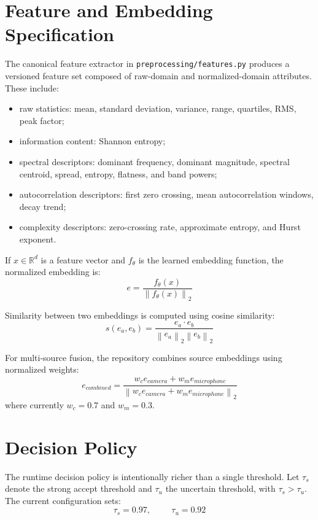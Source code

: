 \documentclass[12pt]{report}
\begin{document}
\section{Feature and Embedding Specification}
The canonical feature extractor in \texttt{preprocessing/features.py} produces a versioned feature set composed of raw-domain and normalized-domain attributes. These include:
\begin{itemize}[leftmargin=1.2cm]
\item raw statistics: mean, standard deviation, variance, range, quartiles, RMS, peak factor;
\item information content: Shannon entropy;
\item spectral descriptors: dominant frequency, dominant magnitude, spectral centroid, spread, entropy, flatness, and band powers;
\item autocorrelation descriptors: first zero crossing, mean autocorrelation windows, decay trend;
\item complexity descriptors: zero-crossing rate, approximate entropy, and Hurst exponent.
\end{itemize}

If $x \in \mathbb{R}^{d}$ is a feature vector and $f_{\theta}$ is the learned embedding function, the normalized embedding is:
\begin{equation}
e = \frac{f_{\theta}(x)}{\left\lVert f_{\theta}(x) \right\rVert_2}
\end{equation}

Similarity between two embeddings is computed using cosine similarity:
\begin{equation}
s(e_a, e_b) = \frac{e_a \cdot e_b}{\left\lVert e_a \right\rVert_2 \left\lVert e_b \right\rVert_2}
\end{equation}

For multi-source fusion, the repository combines source embeddings using normalized weights:
\begin{equation}
e_{combined} = \frac{w_c e_{camera} + w_m e_{microphone}}{\left\lVert w_c e_{camera} + w_m e_{microphone} \right\rVert_2}
\end{equation}
where currently $w_c = 0.7$ and $w_m = 0.3$.

\section{Decision Policy}
The runtime decision policy is intentionally richer than a single threshold. Let $\tau_s$ denote the strong accept threshold and $\tau_u$ the uncertain threshold, with $\tau_s > \tau_u$. The current configuration sets:
\begin{equation}
\tau_s = 0.97,\hspace{1cm}\tau_u = 0.92
\end{equation}
\end{document}
